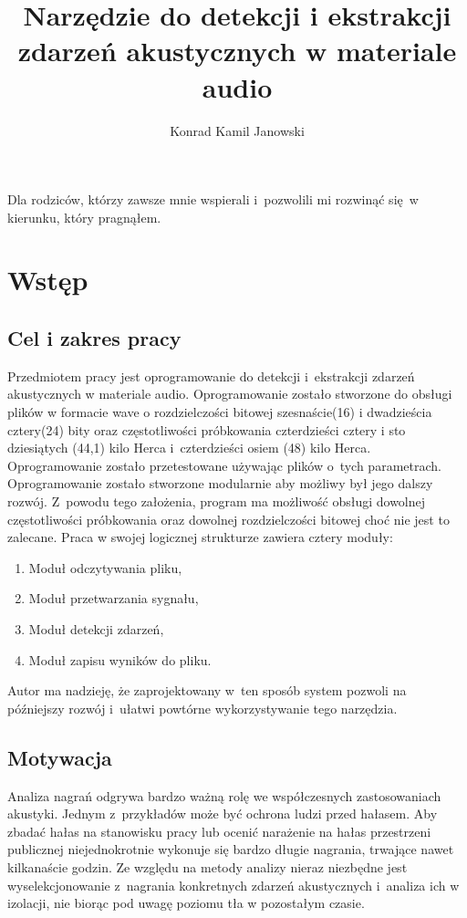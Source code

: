 \documentclass[eng,printmode]{mgr}
\title{Narzędzie do detekcji i ekstrakcji zdarzeń akustycznych w materiale audio}
\author{Konrad Kamil Janowski}
\begin{document}

\maketitle %
\dedication{6cm}{Dla rodziców, którzy zawsze mnie wspierali i~pozwolili mi rozwinąć się~w kierunku, który pragnąłem.}

\tableofcontents %

\chapter{Wstęp}
\section{Cel i zakres pracy}
Przedmiotem pracy jest oprogramowanie do detekcji i~ekstrakcji zdarzeń akustycznych w materiale audio. Oprogramowanie zostało stworzone do obsługi plików w formacie wave o rozdzielczości bitowej szesnaście(16) i dwadzieścia cztery(24) bity oraz częstotliwości próbkowania czterdzieści cztery i sto dziesiątych (44,1) kilo Herca i~czterdzieści osiem (48) kilo Herca. Oprogramowanie zostało przetestowane używając plików o~tych parametrach. Oprogramowanie zostało stworzone modularnie aby możliwy był jego dalszy rozwój. Z~powodu tego założenia, program ma możliwość obsługi dowolnej częstotliwości próbkowania oraz dowolnej rozdzielczości bitowej choć nie jest to zalecane. Praca w swojej logicznej strukturze zawiera cztery moduły:
\begin{enumerate}
\item Moduł odczytywania pliku,
\item Moduł przetwarzania sygnału,
\item Moduł detekcji zdarzeń,
\item Moduł zapisu wyników do pliku.
\end{enumerate}
Autor ma nadzieję, że zaprojektowany w~ten sposób system pozwoli na późniejszy rozwój i~ułatwi powtórne wykorzystywanie tego narzędzia.
\section{Motywacja}
Analiza nagrań odgrywa bardzo ważną rolę we współczesnych zastosowaniach akustyki. Jednym z~przykładów może być ochrona ludzi przed hałasem. Aby zbadać hałas na stanowisku pracy lub ocenić narażenie na hałas przestrzeni publicznej niejednokrotnie wykonuje się bardzo długie nagrania, trwające nawet kilkanaście godzin. Ze względu na metody analizy nieraz niezbędne jest wyselekcjonowanie z~nagrania konkretnych zdarzeń akustycznych i~analiza ich w izolacji, nie biorąc pod uwagę poziomu tła w pozostałym czasie. 
\end{document}
